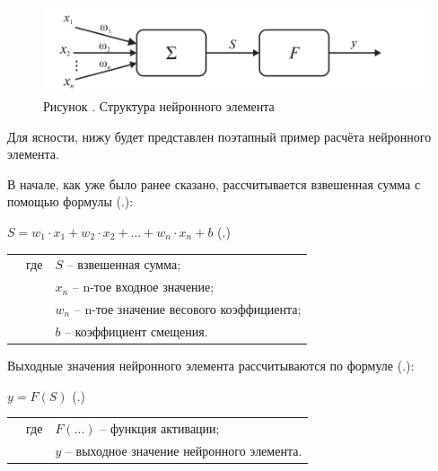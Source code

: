 {\begin{figure}[H]
	\centering
	\def\svgwidth{\textwidth}
	\includegraphics[width=\textwidth]{images/neiron.png}
	\caption*{\gostFont Рисунок \thechaptercntr .\theimagecntr \spc {--} Структура нейронного элемента}
	\label{fig:Neuron}
\end{figure} \addtocounter{imagecntr}{1}  
	
 \par \redline Для ясности, нижу будет представлен поэтапный пример расчёта нейронного элемента.

\par \redline В начале, как уже было ранее сказано, рассчитывается взвешенная сумма с помощью формулы (\thechaptercntr .\theformulacntr):

\formulaspace
\par \redline $S = w_1 \cdot x_1 + w_2 \cdot x_2 + \dots + w_n \cdot x_n + b$ \hfill (\thechaptercntr .\theformulacntr) \redline
\formulaspace \addtocounter{formulacntr}{1}

\begin{tabular}{p{}p{}p{}}
	& где  & $S$ {--} взвешенная сумма; \\
	& 	   & $x_n$ {--} n-тое входное значение; \\
	& 	   & $w_n$ {--} n-тое значение весового коэффициента; \\
	& 	   & $b$ {--} коэффициент смещения. \\
\end{tabular}

 \par \redline Выходные значения нейронного элемента рассчитываются по формуле (\thechaptercntr .\theformulacntr):

\formulaspace
\par \redline $y = F \left(S\right)$ \hfill (\thechaptercntr .\theformulacntr) \redline
\formulaspace \addtocounter{formulacntr}{1}

\begin{tabular}{p{}p{}p{}}
	& где  & $F({...})$ {--} функция активации; \\
	& 	   & $y$ {--} выходное значение нейронного элемента. \\
\end{tabular}
	
}

